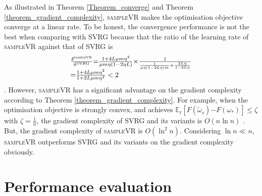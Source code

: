 \documentclass[letterpaper]{article}
\begin{document}
 As illustrated in Theorem \ref{Theorem_converge} and Theorem \ref{theorem_gradient_complexity}, \textsc{sampleVR} makes the optimisation objective converge at a linear rate. To be honest,  the convergence performance is  not the best when comparing with SVRG  because that the ratio of the learning rate of \textsc{sampleVR} against that of \textsc{SVRG} is
\begin{equation}
\begin{array}{ll}
\frac{\delta^{\mathrm{\textsc{sampleVR}}}}{\delta^{\mathrm{SVRG}}} \mathrm{=} \frac{1+4L \mu m\eta^2}{\mu m \eta(1-2\eta L)} \mathrm{\times} \frac{1}{\frac{1}{\mu \eta(1-2L\eta)m} + \frac{2L\eta}{1-2L\eta}}  \\
\mathrm{=} \frac{1+4L\mu m \eta^2}{1+2L\mu m \eta^2} <2   \\
 \end{array} 
\end{equation}. However, \textsc{sampleVR} has a significant advantage on the gradient complexity according to Theorem \ref{theorem_gradient_complexity}. For example, when the optimisation objective is strongly convex, and achieves $\mathbb{E}_t[F(\tilde{\omega}_s)\mathrm{-}F(\omega_\ast)] \le \zeta$ with $\zeta=\frac{1}{n}$, the gradient complexity of SVRG and its variants is $O\left(n \ln n\right)$ \cite{Allen2015UniVR}. But, the gradient complexity of \textsc{sampleVR}  is $O( \ln^2 n ) $. Considering $\ln n \ll n$, \textsc{sampleVR}  outperforms SVRG and its variants on the gradient complexity obviously.




\section{Performance evaluation}
\label{sect_performance_evaluation}

\end{document}
